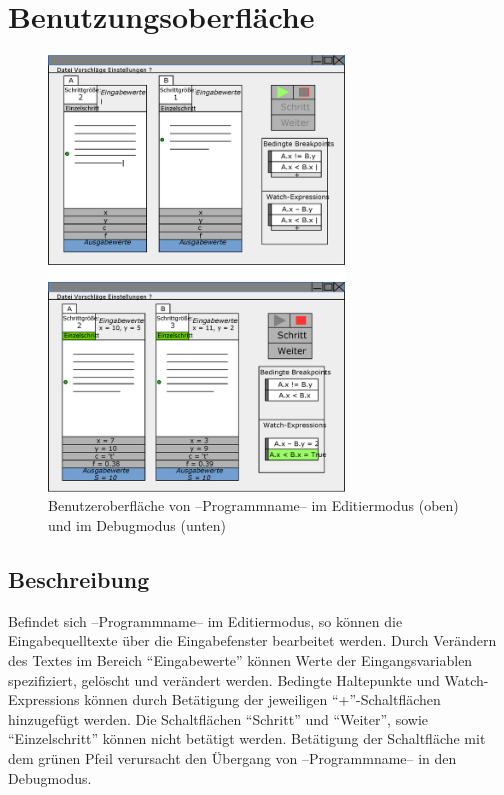 \documentclass[parskip=full]{scrartcl}
\begin{document}
\newpage
\section{Benutzungsoberfläche}
\begin{figure}[!ht] 
    \vspace{-10pt}
    \centering
       \includegraphics[width=0.7\textwidth]{skizzeFull.eps}
       \caption{
         Benutzeroberfläche von --Programmname-- im Editiermodus (oben) und im Debugmodus
         (unten)
       }
    \label{fig:Bild1}
\end{figure}

    \subsection{Beschreibung}
        Befindet sich --Programmname-- im Editiermodus, so können die Eingabequelltexte über die 
        Eingabefenster bearbeitet werden.
        Durch Verändern des Textes im Bereich \enquote{Eingabewerte} können Werte der Eingangsvariablen
        spezifiziert, gelöscht und verändert werden. 
        Bedingte Haltepunkte und Watch-Expressions können durch Betätigung der jeweiligen 
        \enquote{+}-Schaltflächen hinzugefügt werden.
        Die Schaltflächen \enquote{Schritt} und \enquote{Weiter}, sowie \enquote{Einzelschritt} können nicht betätigt
        werden. Betätigung der Schaltfläche mit dem grünen Pfeil verursacht den Übergang von
        --Programmname-- in den Debugmodus.
        
\end{document}
